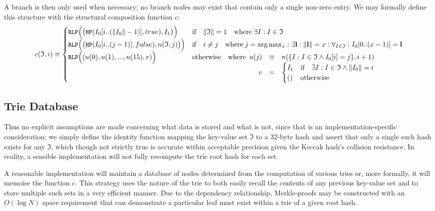 \documentclass[9pt,oneside]{amsart}
\begin{document}
A branch is then only used when necessary; no branch nodes may exist that contain only a single non-zero entry. We may formally define this structure with the structural composition function $c$:
\begin{equation}
c(\mathfrak{I}, i) \equiv \begin{cases}
\texttt{\small RLP}\Big( \big(\texttt{\small HP}(I_0[i .. (\lVert I_0\rVert - 1)], true), I_1 \big) \Big) & \text{if} \quad \lVert \mathfrak{I} \rVert = 1 \quad \text{where} \; \exists I: I \in \mathfrak{I} \\
\texttt{\small RLP}\Big( \big(\texttt{\small HP}(I_0[i .. (j - 1)], false), n(\mathfrak{I}, j) \big) \Big) & \text{if} \quad i \ne j \quad \text{where} \; j = \arg \max_{x} : \exists \mathbf{l}: \lVert \mathbf{l} \rVert = x : \forall_{I \in \mathfrak{I}}: I_0[0 .. (x - 1)] = \mathbf{l} \\
\texttt{\small RLP}\Big( (u(0), u(1), ..., u(15), v) \Big) & \text{otherwise} \quad \text{where} \begin{array}[t]{rcl}
u(j) & \equiv & n(\{ I : I \in \mathfrak{I} \wedge I_0[i] = j \}, i + 1) \\
v & = & \begin{cases}
I_1 & \text{if} \quad \exists I: I \in \mathfrak{I} \wedge \lVert I_0 \rVert = i \\
() & \text{otherwise}
\end{cases}
\end{array}
\end{cases}
\end{equation}

\subsection{Trie Database}
Thus no explicit assumptions are made concerning what data is stored and what is not, since that is an implementation-specific consideration; we simply define the identity function mapping the key-value set $\mathfrak{I}$ to a 32-byte hash and assert that only a single such hash exists for any $\mathfrak{I}$, which though not strictly true is accurate within acceptable precision given the Keccak hash's collision resistance. In reality, a sensible implementation will not fully recompute the trie root hash for each set.

A reasonable implementation will maintain a database of nodes determined from the computation of various tries or, more formally, it will memoise the function $c$. This strategy uses the nature of the trie to both easily recall the contents of any previous key-value set and to store multiple such sets in a very efficient manner. Due to the dependency relationship, Merkle-proofs may be constructed with an $O(\log N)$ space requirement that can demonstrate a particular leaf must exist within a trie of a given root hash.
\end{document}
